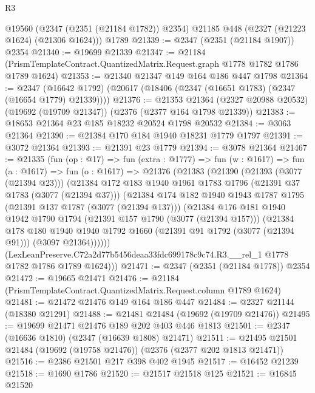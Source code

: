 \begin{lexlean}{R3}
\begin{coremodule}
    @19560 (@2347 (@2351 (@21184 @1782)) @2354) @21185 @448 (@2327 (@21223 @1624) (@21306 @1624)))
    @1789
@21339 := @2347 (@2351 (@21184 @1907)) @2354
@21340 := @19699 @21339
@21347 := @21184 (PrismTemplateContract.QuantizedMatrix.Request.graph @1778 @1782 @1786 @1789 @1624)
@21353 := @21340 @21347 @149 @164 @186 @447 @1798
@21364 := @2347
    (@16642 @1792)
    (@20617 (@18406 (@2347 (@16651 @1783) (@2347 (@16654 @1779) @21339))))
@21376 := @21353
    @21364
    (@2327 @20988 @20532)
    (@19692 (@19709 @21347))
    (@2376 (@2377 @164 @1798 @21339))
@21383 := @18653 @21364 @23 @185 @18232 @20524 @1798 @20532
@21384 := @3063 @21364
@21390 := @21384 @170 @184 @1940 @18231 @1779 @1797
@21391 := @3072 @21364
@21393 := @21391 @23 @1779
@21394 := @3078 @21364
@21467 := @21335
    (fun (op : @17) =>
    fun (extra : @1777) =>
    fun (w : @1617) =>
    fun (a : @1617) =>
    fun (o : @1617) =>
    @21376
      (@21383
        (@21390
          (@21393 (@3077 (@21394 @23)))
          (@21384
            @172
            @183
            @1940
            @1961
            @1783
            @1796
            (@21391 @37 @1783 (@3077 (@21394 @37)))
            (@21384
              @174
              @182
              @1940
              @1943
              @1787
              @1795
              (@21391 @137 @1787 (@3077 (@21394 @137)))
              (@21384
                @176
                @181
                @1940
                @1942
                @1790
                @1794
                (@21391 @157 @1790 (@3077 (@21394 @157)))
                (@21384
                  @178
                  @180
                  @1940
                  @1940
                  @1792
                  @1660
                  (@21391 @91 @1792 (@3077 (@21394 @91)))
                  (@3097 @21364))))))
        (LexLeanPreserve.C72a2d77b5456deaa33fdc699178c9c74.R3.__rel_1
          @1778
          @1782
          @1786
          @1789
          @1624)))
@21471 := @2347 (@2351 (@21184 @1778)) @2354
@21472 := @19665 @21471
@21476 := @21184 (PrismTemplateContract.QuantizedMatrix.Request.column @1789 @1624)
@21481 := @21472 @21476 @149 @164 @186 @447
@21484 := @2327 @21144 (@18380 @21291)
@21488 := @21481 @21484 (@19692 (@19709 @21476))
@21495 := @19699 @21471 @21476 @189 @202 @403 @446 @1813
@21501 := @2347 (@16636 @1810) (@2347 (@16639 @1808) @21471)
@21511 := @21495 @21501 @21484 (@19692 (@19758 @21476)) (@2376 (@2377 @202 @1813 @21471))
@21516 := @2386 @21501 @217 @398 @402 @1945
@21517 := @16452 @21239
@21518 := @1690 @1786
@21520 := @21517 @21518 @125
@21521 := @16845 @21520

\end{coremodule}
\end{lexlean}
